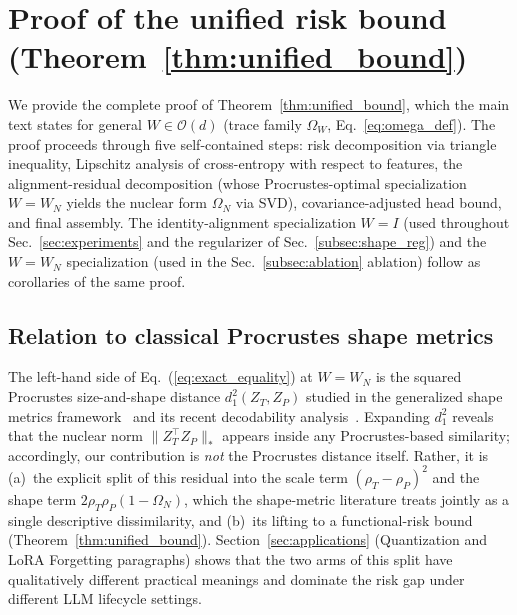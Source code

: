 

\section{Proof of the unified risk bound (Theorem~\ref{thm:unified_bound})}
\label{app:detailed_proofs}

We provide the complete proof of Theorem~\ref{thm:unified_bound}, which the main text states for general $W \in \mathcal{O}(d)$ (trace family $\Omega_W$, Eq.~\ref{eq:omega_def}). The proof proceeds through five self-contained steps: risk decomposition via triangle inequality, Lipschitz analysis of cross-entropy with respect to features, the alignment-residual decomposition (whose Procrustes-optimal specialization $W = W_N$ yields the nuclear form $\Omega_N$ via SVD), covariance-adjusted head bound, and final assembly. The identity-alignment specialization $W = I$ (used throughout Sec.~\ref{sec:experiments} and the regularizer of Sec.~\ref{subsec:shape_reg}) and the $W = W_N$ specialization (used in the Sec.~\ref{subsec:ablation} ablation) follow as corollaries of the same proof.

\subsection{Relation to classical Procrustes shape metrics}
\label{app:shape_metrics_relation}

The left-hand side of Eq.~(\ref{eq:exact_equality}) at $W = W_N$ is the squared Procrustes size-and-shape distance $d_1^2(Z_T, Z_P)$ studied in the generalized shape metrics framework~\cite{williams2021generalized} and its recent decodability analysis~\cite{harvey2024what}. Expanding $d_1^2$ reveals that the nuclear norm $\|Z_T^\top Z_P\|_*$ appears inside any Procrustes-based similarity; accordingly, our contribution is \emph{not} the Procrustes distance itself. Rather, it is (a)~the explicit split of this residual into the scale term $(\rho_T-\rho_P)^2$ and the shape term $2\rho_T\rho_P(1-\Omega_N)$, which the shape-metric literature treats jointly as a single descriptive dissimilarity, and (b)~its lifting to a functional-risk bound (Theorem~\ref{thm:unified_bound}). Section~\ref{sec:applications} (Quantization and LoRA Forgetting paragraphs) shows that the two arms of this split have qualitatively different practical meanings and dominate the risk gap under different LLM lifecycle settings.



